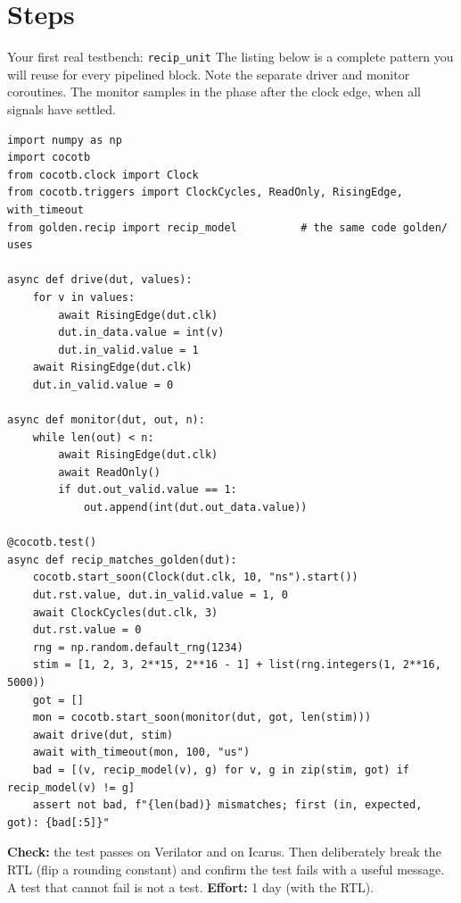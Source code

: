 \section{Steps}\label{sec:verif:steps}

\begin{stepbox}[label=st:verif:first]{Your first real testbench: \texttt{recip\_unit}}
The listing below is a complete pattern you will reuse for every pipelined
block. Note the separate driver and monitor coroutines. The monitor samples in
the  phase after the clock edge, when all signals have settled.

\begin{lstlisting}[style=py]
import numpy as np
import cocotb
from cocotb.clock import Clock
from cocotb.triggers import ClockCycles, ReadOnly, RisingEdge, with_timeout
from golden.recip import recip_model          # the same code golden/ uses

async def drive(dut, values):
    for v in values:
        await RisingEdge(dut.clk)
        dut.in_data.value = int(v)
        dut.in_valid.value = 1
    await RisingEdge(dut.clk)
    dut.in_valid.value = 0

async def monitor(dut, out, n):
    while len(out) < n:
        await RisingEdge(dut.clk)
        await ReadOnly()
        if dut.out_valid.value == 1:
            out.append(int(dut.out_data.value))

@cocotb.test()
async def recip_matches_golden(dut):
    cocotb.start_soon(Clock(dut.clk, 10, "ns").start())
    dut.rst.value, dut.in_valid.value = 1, 0
    await ClockCycles(dut.clk, 3)
    dut.rst.value = 0
    rng = np.random.default_rng(1234)
    stim = [1, 2, 3, 2**15, 2**16 - 1] + list(rng.integers(1, 2**16, 5000))
    got = []
    mon = cocotb.start_soon(monitor(dut, got, len(stim)))
    await drive(dut, stim)
    await with_timeout(mon, 100, "us")
    bad = [(v, recip_model(v), g) for v, g in zip(stim, got) if recip_model(v) != g]
    assert not bad, f"{len(bad)} mismatches; first (in, expected, got): {bad[:5]}"
\end{lstlisting}

\textbf{Check:} the test passes on Verilator and on Icarus. Then deliberately
break the RTL (flip a rounding constant) and confirm the test fails with a
useful message. A test that cannot fail is not a test. \textbf{Effort:} 1 day
(with the RTL).
\end{stepbox}

